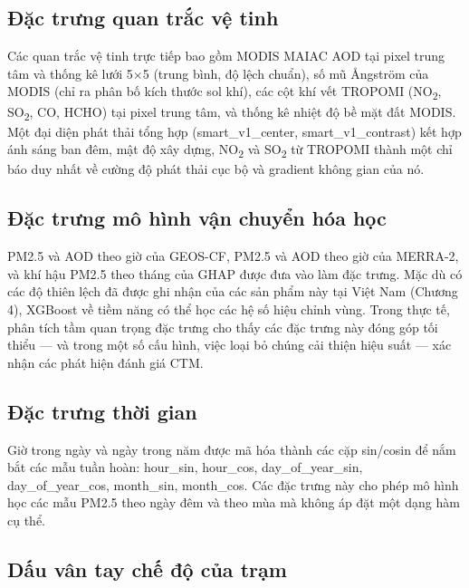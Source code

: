 \subsection{Đặc trưng quan trắc vệ tinh}

Các quan trắc vệ tinh trực tiếp bao gồm MODIS MAIAC AOD tại pixel trung tâm và thống kê lưới 5$\times$5 (trung bình, độ lệch chuẩn), số mũ Ångström của MODIS (chỉ ra phân bố kích thước sol khí), các cột khí vết TROPOMI (NO\textsubscript{2}, SO\textsubscript{2}, CO, HCHO) tại pixel trung tâm, và thống kê nhiệt độ bề mặt đất MODIS. Một đại diện phát thải tổng hợp (smart\_v1\_center, smart\_v1\_contrast) kết hợp ánh sáng ban đêm, mật độ xây dựng, NO\textsubscript{2} và SO\textsubscript{2} từ TROPOMI thành một chỉ báo duy nhất về cường độ phát thải cục bộ và gradient không gian của nó.

\subsection{Đặc trưng mô hình vận chuyển hóa học}

PM2.5 và AOD theo giờ của GEOS-CF, PM2.5 và AOD theo giờ của MERRA-2, và khí hậu PM2.5 theo tháng của GHAP được đưa vào làm đặc trưng. Mặc dù có các độ thiên lệch đã được ghi nhận của các sản phẩm này tại Việt Nam (Chương 4), XGBoost về tiềm năng có thể học các hệ số hiệu chỉnh vùng. Trong thực tế, phân tích tầm quan trọng đặc trưng cho thấy các đặc trưng này đóng góp tối thiểu --- và trong một số cấu hình, việc loại bỏ chúng cải thiện hiệu suất --- xác nhận các phát hiện đánh giá CTM.

\subsection{Đặc trưng thời gian}

Giờ trong ngày và ngày trong năm được mã hóa thành các cặp sin/cosin để nắm bắt các mẫu tuần hoàn: hour\_sin, hour\_cos, day\_of\_year\_sin, day\_of\_year\_cos, month\_sin, month\_cos. Các đặc trưng này cho phép mô hình học các mẫu PM2.5 theo ngày đêm và theo mùa mà không áp đặt một dạng hàm cụ thể.

\subsection{Dấu vân tay chế độ của trạm}

